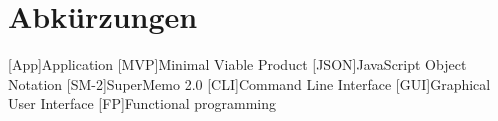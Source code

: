 \chapter{Abkürzungen}\label{a:Abkuerzungen}

\begin{acronym}
    [App]{Application}
    [MVP]{Minimal Viable Product}
    [JSON]{JavaScript Object Notation}
    [SM-2]{SuperMemo 2.0}
    [CLI]{Command Line Interface}
    [GUI]{Graphical User Interface}
    [FP]{Functional programming}

\end{acronym}